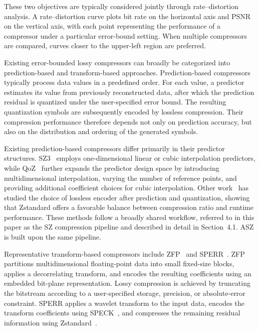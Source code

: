 These two objectives are typically considered jointly through rate--distortion analysis. A rate--distortion curve plots bit rate on the horizontal axis and PSNR on the vertical axis, with each point representing the performance of a compressor under a particular error-bound setting. When multiple compressors are compared, curves closer to the upper-left region are preferred.

Existing error-bounded lossy compressors can broadly be categorized into prediction-based and transform-based approaches. Prediction-based compressors typically process data values in a predefined order. For each value, a predictor estimates its value from previously reconstructed data, after which the prediction residual is quantized under the user-specified error bound. The resulting quantization symbols are subsequently encoded by lossless compression. Their compression performance therefore depends not only on prediction accuracy, but also on the distribution and ordering of the generated symbols.

Existing prediction-based compressors differ primarily in their predictor structures. SZ3~\cite{liang2022sz3,zhao2021optimizing} employs one-dimensional linear or cubic interpolation predictors, while QoZ~\cite{liu2022dynamic,liu2024high} further expands the predictor design space by introducing multidimensional interpolation, varying the number of reference points, and providing additional coefficient choices for cubic interpolation. Other work~\cite{liu2021improving} has studied the choice of lossless encoder after prediction and quantization, showing that Zstandard offers a favorable balance between compression ratio and runtime performance. These methods follow a broadly shared workflow, referred to in this paper as the SZ compression pipeline and described in detail in Section~4.1. ASZ is built upon the same pipeline.

Representative transform-based compressors include ZFP~\cite{lindstrom2014fixed,diffenderfer2019error} and SPERR~\cite{li2023lossy}. ZFP partitions multidimensional floating-point data into small fixed-size blocks, applies a decorrelating transform, and encodes the resulting coefficients using an embedded bit-plane representation. Lossy compression is achieved by truncating the bitstream according to a user-specified storage, precision, or absolute-error constraint. SPERR applies a wavelet transform to the input data, encodes the transform coefficients using SPECK~\cite{Pearlman2004speck}, and compresses the remaining residual information using Zstandard~\cite{ycollet2021zstd}.

